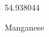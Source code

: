 \documentclass[12pt]{article}
\begin{document}
\hfill{}
\vfill
\begin{center}
  {\fontsize{50}{60}
  }

  54.938044

Manganese
\end{center}
\vfill
\end{document}
